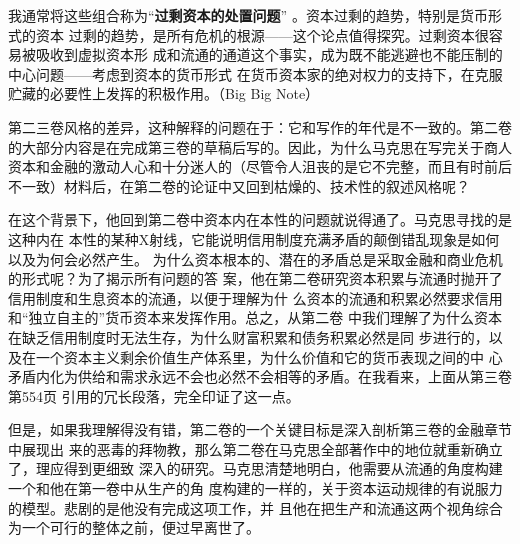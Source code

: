 我通常将这些组合称为“\textbf{过剩资本的处置问题}” 。资本过剩的趋势，特别是货币形式的资本
过剩的趋势，是所有危机的根源——这个论点值得探究。过剩资本很容易被吸收到虚拟资本形
成和流通的通道这个事实，成为既不能逃避也不能压制的中心问题——考虑到资本的货币形式
在货币资本家的绝对权力的支持下，在克服贮藏的必要性上发挥的积极作用。（Big Big Note）

第二三卷风格的差异，这种解释的问题在于：它和写作的年代是不一致的。第二卷的大部分内容是在完成第三卷的草稿后写的。因此，为什么马克思在写完关于商人资本和金融的激动人心和十分迷人的（尽管令人沮丧的是它不完整，而且有时前后不一致）材料后，在第二卷的论证中又回到枯燥的、技术性的叙述风格呢？


在这个背景下，他回到第二卷中资本内在本性的问题就说得通了。马克思寻找的是这种内在
本性的某种X射线，它能说明信用制度充满矛盾的颠倒错乱现象是如何以及为何会必然产生。
为什么资本根本的、潜在的矛盾总是采取金融和商业危机的形式呢？为了揭示所有问题的答
案，他在第二卷研究资本积累与流通时抛开了信用制度和生息资本的流通，以便于理解为什
么资本的流通和积累必然要求信用和“独立自主的”货币资本来发挥作用。总之，从第二卷
中我们理解了为什么资本在缺乏信用制度时无法生存，为什么财富积累和债务积累必然是同
步进行的，以及在一个资本主义剩余价值生产体系里，为什么价值和它的货币表现之间的中
心矛盾内化为供给和需求永远不会也必然不会相等的矛盾。在我看来，上面从第三卷第554页
引用的冗长段落，完全印证了这一点。

但是，如果我理解得没有错，第二卷的一个关键目标是深入剖析第三卷的金融章节中展现出
来的恶毒的拜物教，那么第二卷在马克思全部著作中的地位就重新确立了，理应得到更细致
深入的研究。马克思清楚地明白，他需要从流通的角度构建一个和他在第一卷中从生产的角
度构建的一样的，关于资本运动规律的有说服力的模型。悲剧的是他没有完成这项工作，并
且他在把生产和流通这两个视角综合为一个可行的整体之前，便过早离世了。



